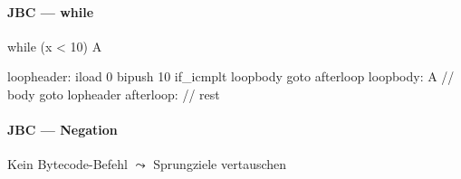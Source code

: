 \paragraph{JBC --- while}
\begin{java}
  while (x < 10) { A }
\end{java}
\begin{java}
loopheader:
  iload 0
  bipush 10
  if_icmplt loopbody
  goto afterloop
loopbody:
  A // body
  goto lopheader
afterloop:
  // rest
\end{java}

\paragraph{JBC --- Negation}
Kein Bytecode-Befehl \( \leadsto \) Sprungziele vertauschen